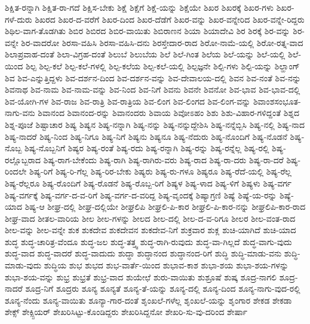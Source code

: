 {ಶಿಕ್ಷಿತ-ರನ್ನಾಗಿ
ಶಿಕ್ಷಿತ-ರಾ-ಗದೆ
ಶಿಕ್ಷಿಸ-ಬೇಕು
ಶಿಕ್ಷೆ
ಶಿಕ್ಷೆಗೆ
ಶಿಕ್ಷೆ-ಯನ್ನು
ಶಿಕ್ಷೆಯೇ
ಶಿಖರ
ಶಿಖರಕ್ಕೆ
ಶಿಖರ-ಗಳು
ಶಿಖರ-ಗಳೆ-ದುರು
ಶಿಖರದ
ಶಿಖರ-ದ-ವರೆಗೆ
ಶಿಖರ-ದಿಂದ
ಶಿಖರ-ದೆಡೆಗೆ
ಶಿಖರ-ವನ್ನು
ಶಿಖರ-ವನ್ನೇರಿದ
ಶಿಖರ-ವನ್ನೇ-ರಿದ್ದರು
ಶಿಥಿಲ-ವಾಗ-ತೊಡಗಿತು
ಶಿಬಿರ
ಶಿಬಿರದ
ಶಿಬಿರ-ವಾಯಿತು
ಶಿಬಿರಾಣನ
ಶಿಯಾ
ಶಿಯಾದೇವಿ
ಶಿರ
ಶಿರಕ್ಕೆ
ಶಿರ-ವನ್ನು
ಶಿರ-ವನ್ನೇ
ಶಿರ-ವಾದರೋ
ಶಿರಸಾ-ವಹಿಸಿ
ಶಿರಸಾ-ವಹಿಸಿ-ದನು
ಶಿರಸ್ತೇದಾರ-ರಾದ
ಶಿರೋ-ನಾಮೆ-ಯಲ್ಲಿ
ಶಿರೋ-ರತ್ನ-ವಾದ
ಶಿಲಾಪ್ರವಾಹ-ದಂತೆ
ಶಿಲಾ-ವಿಗ್ರಹ-ದಂತೆ
ಶಿಲುಬೆ
ಶಿಲುಬೆಯ
ಶಿಲೆ
ಶಿಲೆ-ಗಿಂತ
ಶಿಲೆಯ
ಶಿಲೆ-ಯನ್ನು
ಶಿಲೆ-ಯಲ್ಲಿ
ಶಿಲೆ-ಯಿಂದ
ಶಿಲ್ಪ
ಶಿಲ್ಪ-ಕಲೆ
ಶಿಲ್ಪ-ಕಲೆ-ಗಳಲ್ಲಿ
ಶಿಲ್ಪ-ಕಲೆಯ
ಶಿಲ್ಪ-ಕಲೆ-ಯಲ್ಲಿ
ಶಿಲ್ಪಜ್ಞನೇ
ಶಿಲ್ಪಿ-ಗಳು
ಶಿಲ್ಪಿ-ಯನ್ನು
ಶಿಲ್ಹಾಂಗ್
ಶಿವ
ಶಿವ-ಎನ್ನುತ್ತಿದ್ದಳು
ಶಿವ-ದರ್ಶನ-ದಿಂದ
ಶಿವ-ದರ್ಶನ-ವನ್ನು
ಶಿವ-ದೇವಾಲಯ-ದಲ್ಲಿ
ಶಿವನ
ಶಿವ-ನಂತೆ
ಶಿವ-ನನ್ನು
ಶಿವನಾಥ
ಶಿವ-ನಾಮ
ಶಿವ-ನಾಮ-ವನ್ನು
ಶಿವ-ನಿಂದ
ಶಿವ-ನಿಗೆ
ಶಿವನು
ಶಿವನೇ
ಶಿವನೋ
ಶಿವ-ಭಾವ
ಶಿವ-ಭಾವ-ದಲ್ಲಿ
ಶಿವ-ಯೋಗಿ-ಗಳ
ಶಿವ-ರಾಜ
ಶಿವ-ರಾತ್ರಿ
ಶಿವ-ರಾತ್ರಿಯ
ಶಿವ-ಲಿಂಗ
ಶಿವ-ಲಿಂಗದ
ಶಿವ-ಲಿಂಗ-ವನ್ನು
ಶಿವಾಂಶಸಂಭೂತ-ನಾಗು-ವನು
ಶಿವಾನಂದ
ಶಿವಾನಂದ-ರನ್ನು
ಶಿವಾನಂದರು
ಶಿವಾಯ
ಶಿವೋಽಹಂ
ಶಿಶು
ಶಿಶು-ವಿಹಾರ-ಗಳಿದ್ದಂತೆ
ಶಿಶ್ನದ
ಶಿಶ್ನ-ಪೂಜೆ
ಶಿಷ್ಟಾಚಾರ
ಶಿಷ್ಯ
ಶಿಷ್ಯನ
ಶಿಷ್ಯ-ನನ್ನಾಗಿ
ಶಿಷ್ಯ-ನನ್ನು
ಶಿಷ್ಯ-ನನ್ನುದ್ದೇಶಿಸಿ
ಶಿಷ್ಯ-ನನ್ನೆಬ್ಬಿಸಿ
ಶಿಷ್ಯ-ನಲ್ಲಿ
ಶಿಷ್ಯ-ನಾದ
ಶಿಷ್ಯ-ನಾದರೆ
ಶಿಷ್ಯ-ನಿಂದ
ಶಿಷ್ಯ-ನಿಗೂ
ಶಿಷ್ಯ-ನಿಗೆ
ಶಿಷ್ಯನು
ಶಿಷ್ಯನೂ
ಶಿಷ್ಯ-ನೆದುರು
ಶಿಷ್ಯ-ನೊಂದಿಗೆ
ಶಿಷ್ಯ-ನೊಡನೆ
ಶಿಷ್ಯ-ನೊಬ್ಬ
ಶಿಷ್ಯ-ನೊಬ್ಬನಿಗೆ
ಶಿಷ್ಯರ
ಶಿಷ್ಯ-ರಂತೆ
ಶಿಷ್ಯ-ರದು
ಶಿಷ್ಯ-ರನ್ನಾಗಿ
ಶಿಷ್ಯ-ರನ್ನು
ಶಿಷ್ಯ-ರನ್ನೆಲ್ಲ
ಶಿಷ್ಯ-ರಲ್ಲಿ
ಶಿಷ್ಯ-ರಲ್ಲೊಬ್ಬರಾದ
ಶಿಷ್ಯ-ರಾಗ-ಬೇಕೆಂದು
ಶಿಷ್ಯ-ರಾಗಿ
ಶಿಷ್ಯ-ರಾಗಿರು-ವರು
ಶಿಷ್ಯ-ರಾದ
ಶಿಷ್ಯ-ರಾ-ದರು
ಶಿಷ್ಯ-ರಾ-ದರೆ
ಶಿಷ್ಯ-ರಿಂದಲೇ
ಶಿಷ್ಯ-ರಿಗೆ
ಶಿಷ್ಯ-ರಿ-ಗೆಲ್ಲ
ಶಿಷ್ಯ-ರಿರ-ಬೇಕು
ಶಿಷ್ಯರು
ಶಿಷ್ಯ-ರು-ಗಳೂ
ಶಿಷ್ಯರೂ
ಶಿಷ್ಯ-ರೆದೆ-ಯಲ್ಲಿ
ಶಿಷ್ಯ-ರೆಲ್ಲ
ಶಿಷ್ಯ-ರೆಲ್ಲರೂ
ಶಿಷ್ಯ-ರೊಂದಿಗೆ
ಶಿಷ್ಯ-ರೊಡನೆ
ಶಿಷ್ಯ-ರೊಬ್ಬ-ರಿಗೆ
ಶಿಷ್ಯಳ
ಶಿಷ್ಯ-ಳಾದ
ಶಿಷ್ಯ-ಳಿಗೆ
ಶಿಷ್ಯಳು
ಶಿಷ್ಯ-ವರ್ಗ
ಶಿಷ್ಯ-ವರ್ಗಕ್ಕೆ
ಶಿಷ್ಯ-ವರ್ಗ-ದ-ವ-ರಿಗೆ
ಶಿಷ್ಯ-ವರ್ಗ-ದ-ವರಿದ್ದ
ಶಿಷ್ಯ-ವೃಂದಕ್ಕೆ
ಶಿಷ್ಯಾಗ್ರಣಿ
ಶಿಷ್ಯೆ
ಶಿಷ್ಯೆ-ಯ-ರನ್ನು
ಶಿಷ್ಯೆ-ಯಾದ
ಶಿಷ್ಯ-ಆ
ಶೀಘ್ರ-ದಲ್ಲಿ
ಶೀಘ್ರ-ದಲ್ಲಿಯೇ
ಶೀಘ್ರಲಿಪಿ
ಶೀಘ್ರಲಿ-ಪಿ-ಕಾರ
ಶೀಘ್ರಲಿ-ಪಿ-ಕಾರ-ನನ್ನು
ಶೀಘ್ರಲಿಪಿ-ಕಾರ-ರಾದ
ಶೀಘ್ರ-ವಾದ
ಶೀತಲ-ವಾರಿಯ
ಶೀಲ
ಶೀಲ-ಗಳನ್ನು
ಶೀಲದ
ಶೀಲ-ದಲ್ಲಿ
ಶೀಲ-ದ-ವ-ರಿಗೂ
ಶೀಲರ
ಶೀಲ-ವಂತ-ರಾದ
ಶೀಲ-ವನ್ನು
ಶೀಲ-ವನ್ನೇ
ಶುಕ
ಶುಕದೇವ
ಶುಕದೇವನ
ಶುಕದೇವ-ನಿಗೆ
ಶುಕ್ರವಾರ
ಶುಕ್ಲ
ಶುಚಿ-ಯಾಗಿದೆ
ಶುಚಿ-ಯಾದ
ಶುದ್ಧ
ಶುದ್ಧ-ಚಾರಿತ್ರ-ವೆಂದೂ
ಶುದ್ಧ-ಜಲ
ಶುದ್ಧ-ತತ್ತ್ವ
ಶುದ್ಧ-ರಾಗಿ-ರುವುದು
ಶುದ್ಧ-ವಾ-ಗಿಲ್ಲದೆ
ಶುದ್ಧ-ವಾಗು-ವುದು
ಶುದ್ಧ-ವಾದ
ಶುದ್ಧ-ವಾದರೆ
ಶುದ್ಧ-ವಾದುದು
ಶುದ್ಧಾ
ಶುದ್ಧಾನಂದ
ಶುದ್ಧಾನಂದ-ರಿಗೆ
ಶುದ್ಧಿ
ಶುದ್ಧಿ-ಮಾಡು-ವನು
ಶುದ್ಧಿ-ಮಾಡು-ವುದು
ಶುದ್ಧಿಯ
ಶುಭ
ಶುಭದ
ಶುಭ-ವಾರ್ತೆ-ಯಿಂದ
ಶುಭಾವ-ಕಾಶ
ಶುಭಾ-ಶಯ
ಶುಭಾ-ಶಯ-ಗಳನ್ನು
ಶುಭಾ-ಶಯ-ವನ್ನು
ಶುಭ್ರ
ಶುಭ್ರತೆ
ಶುಭ್ರ-ವಾದ
ಶುಯೇಛೆ
ಶುರು-ವಾಯಿತು
ಶುಶ್ರೂಷೆ
ಶುಷ್ಕ
ಶೂದ್ರ-ನಾಗಲಿ
ಶೂದ್ರ-ನಾದರೆ
ಶೂದ್ರ-ನಿಗೆ
ಶೂದ್ರರು
ಶೂನ್ಯ
ಶೂನ್ಯತೆ
ಶೂನ್ಯ-ತೆ-ಯನ್ನು
ಶೂನ್ಯ-ದಲ್ಲಿ
ಶೂನ್ಯ-ದಿಂದ
ಶೂನ್ಯ-ನಾಗು-ವುದ-ರಲ್ಲಿ
ಶೂನ್ಯ-ನೆಂದು
ಶೂನ್ಯ-ವಾಯಿತು
ಶೂನ್ಯಾ-ಗಾರ-ದಂತೆ
ಶೃಂಖಲೆ-ಗಳೆಲ್ಲ
ಶೃಂಖಲೆ-ಯನ್ನು
ಶೃಂಗಾರ
ಶೇಕಡ
ಶೇಕಡಾ
ಶೇಕ್ಸ್
ಶೇಕ್ಸ್ಪಿಯರ್
ಶೇಖರಿಸಿಟ್ಟು-ಕೊಂಡಿದ್ದರು
ಶೇಖರಿಸಿದ್ದನೋ
ಶೇಖರಿ-ಸು-ವು-ದರಿಂದ
ಶೇರ್ಷಾ
}
